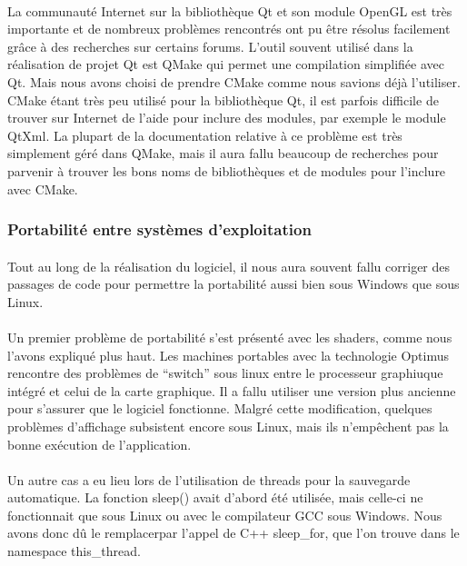 \paragraph{}
La communauté Internet sur la bibliothèque Qt et son module OpenGL est très importante et de nombreux problèmes rencontrés ont pu être résolus facilement grâce à des recherches sur certains forums. 
L'outil souvent utilisé dans la réalisation de projet Qt est QMake qui permet une compilation simplifiée avec Qt. Mais nous avons choisi de prendre CMake comme nous savions déjà l'utiliser.
CMake étant très peu utilisé pour la bibliothèque Qt, il est parfois difficile de trouver sur Internet de l'aide pour inclure des modules, par exemple le module QtXml. La plupart de la documentation relative à ce problème est très simplement géré dans QMake, mais il aura fallu beaucoup de recherches pour parvenir à trouver les bons noms de bibliothèques et de modules pour l'inclure avec CMake.

\subsubsection{Portabilité entre systèmes d'exploitation}
\paragraph{}
Tout au long de la réalisation du logiciel, il nous aura souvent fallu corriger des passages de code pour permettre la portabilité aussi bien sous Windows que sous Linux. 
\paragraph{}
Un premier problème de portabilité s'est présenté avec les shaders, comme nous l'avons expliqué plus haut. Les machines portables avec la technologie Optimus rencontre des problèmes de ``switch'' sous linux entre le processeur graphiuque intégré et celui de la carte graphique. Il a fallu utiliser une version plus ancienne pour s'assurer que le logiciel fonctionne. Malgré cette modification, quelques problèmes d'affichage subsistent encore sous Linux, mais ils n'empêchent pas la bonne exécution de l'application.

\paragraph{}
Un autre cas a eu lieu lors de l'utilisation de threads pour la sauvegarde automatique. La fonction sleep() avait d'abord été utilisée, mais celle-ci ne fonctionnait que sous Linux ou avec le compilateur GCC sous Windows. Nous avons donc dû le remplacerpar l'appel de C++ sleep\_for, que l'on trouve dans le namespace this\_thread. 

